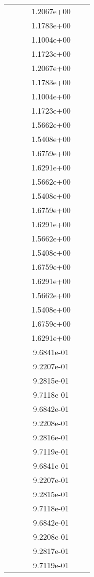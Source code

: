 \begin{xltabular}{\textwidth}{r|rS[table-format=1.3e+2]S[table-format=1.4e+2]S[table-format=1.4e+2]S[table-format=-1.5]}
&  &  & 1.2067e+00 & & \\
&  &  & 1.1783e+00 & & \\
&  &  & 1.1004e+00 & & \\
&  &  & 1.1723e+00 & & \\
&  &  & 1.2067e+00 & & \\
&  &  & 1.1783e+00 & & \\
&  &  & 1.1004e+00 & & \\
&  &  & 1.1723e+00 & & \\
&  &  & 1.5662e+00 & & \\
&  &  & 1.5408e+00 & & \\
&  &  & 1.6759e+00 & & \\
&  &  & 1.6291e+00 & & \\
&  &  & 1.5662e+00 & & \\
&  &  & 1.5408e+00 & & \\
&  &  & 1.6759e+00 & & \\
&  &  & 1.6291e+00 & & \\
&  &  & 1.5662e+00 & & \\
&  &  & 1.5408e+00 & & \\
&  &  & 1.6759e+00 & & \\
&  &  & 1.6291e+00 & & \\
&  &  & 1.5662e+00 & & \\
&  &  & 1.5408e+00 & & \\
&  &  & 1.6759e+00 & & \\
&  &  & 1.6291e+00 & & \\
&  &  & 9.6841e-01 & & \\
&  &  & 9.2207e-01 & & \\
&  &  & 9.2815e-01 & & \\
&  &  & 9.7118e-01 & & \\
&  &  & 9.6842e-01 & & \\
&  &  & 9.2208e-01 & & \\
&  &  & 9.2816e-01 & & \\
&  &  & 9.7119e-01 & & \\
&  &  & 9.6841e-01 & & \\
&  &  & 9.2207e-01 & & \\
&  &  & 9.2815e-01 & & \\
&  &  & 9.7118e-01 & & \\
&  &  & 9.6842e-01 & & \\
&  &  & 9.2208e-01 & & \\
&  &  & 9.2817e-01 & & \\
&  &  & 9.7119e-01 & & \\

\end{xltabular}
